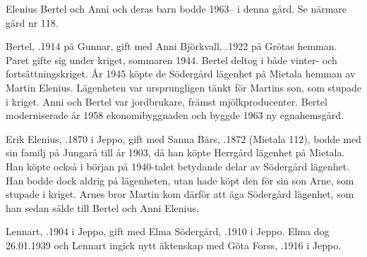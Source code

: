 Elenius Bertel och Anni och deras barn bodde 1963-- i denna gård. Se närmare gård nr 118.\jhvspace{}





Bertel, .1914 på Gunnar, gift med Anni Björkvall, .1922 på Grötas hemman. Paret gifte sig under kriget, sommaren 1944. Bertel deltog i både vinter- och fortsättningskriget. År 1945 köpte de Södergård lägenhet på Mietala hemman av Martin Elenius. Lägenheten var ursprungligen tänkt för Martins son, som stupade i kriget. Anni och Bertel var jordbrukare, främst mjölkproducenter. Bertel moderniserade år 1958 ekonomibyggnaden och byggde 1963 ny egnahemsgård.
\begin{jhchildren}
  \item {}
  \item {}
\end{jhchildren}



Erik Elenius, .1870 i Jeppo, gift med Sanna Bärs, .1872 (Mietala 112), bodde med sin familj på Jungarå till år 1903, då han köpte Herrgård lägenhet på Mietala. Han köpte också i början på 1940-talet betydande delar av Södergård lägenhet. Han bodde dock aldrig på lägenheten, utan hade köpt den för sin son Arne, som stupade i kriget. Arnes bror Martin kom därför att äga Södergård lägenhet, som han sedan sålde till Bertel och Anni Elenius.


Lennart, .1904 i Jeppo, gift med Elma Södergård, .1910 i Jeppo. Elma dog 26.01.1939 och Lennart ingick nytt äktenskap med Göta Forss, .1916  i Jeppo.
\begin{jhchildren}
  \item {}
  \item {}
  \item {}
  \item {}
\end{jhchildren}


